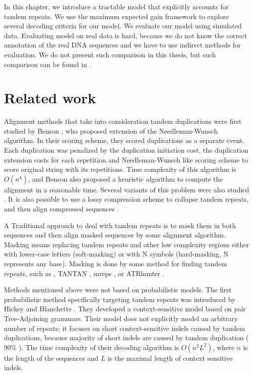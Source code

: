 In this chapter, we introduce a tractable model that explicitly accounts for
tandem repeats. We use the maximum expected gain framework to explore several
decoding criteria for our model. We evaluate our model using simulated data.
Evaluating model on real data is hard, because we do not know the correct
annotation of the real DNA sequences and we have to use indirect methods for
evaluation. We do not present such comparison in this thesis, but such
comparison can be found in \cite{Nanasi2014}.

\section{Related work}\label{SECTION:REPALNMETHODS}

 Alignment methods that take into consideration tandem
duplications were first studied by Benson \cite{Benson1997}, who proposed
extension of the Needleman-Wunsch algorithm. In their scoring scheme, they
scored duplications as a separate event. Each duplication was penalized by the
duplication initiation cost, the duplication extension costs for each
repetition and Needleman-Wunsch like scoring scheme to score original string
with its repetitions. Time complexity of this algorithm is $O(n^4)$, and Benson
also proposed a heuristic algorithm to compute the alignment in a reasonable
time.  Several variants of this problem were also studied \cite{Sammeth2006,
Berard2006}. It is also
possible to use a lossy compression scheme to collapse tandem repeats, and then
align compressed sequences \cite{Freschi2012}.

A Traditional approach to deal with tandem repeats is to mask them in both
sequences and then align masked sequences by some alignment algorithm.  Masking
means replacing tandem repeats and other low complexity regions either with
lower-case letters (soft-masking) or with N symbols (hard-masking, N represents
any base). Masking is done by some method for finding tandem repeats, such as
 \cite{Benson1999}, TANTAN
\cite{Frith2011}, mreps \cite{Kolpakov2003}, or ATRhunter \cite{Wexler2005}. 

Methods mentioned above were not based on probabilistic models. The first
probabilistic method specifically targeting tandem repeats was introduced by
Hickey and Blanchette \cite{Hickey2011}.  They developed a context-sensitive
model based on pair Tree-Adjoining grammars.  Their model does not explicitly
model an arbitrary number of repeats; it focuses on short context-sensitive
indels caused by tandem duplications, because majority of short indels are
caused by tandem duplication ($90\%$ \cite{Hickey2011}). The time complexity of
their decoding algorithm is $O(n^2L^2)$, where $n$ is the length of the
sequences and $L$ is the maximal length of context sensitive indels.

